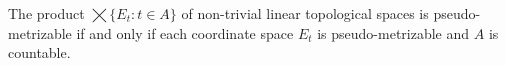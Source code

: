 The product $\bigtimes \{E_t : t \in A\}$ of non-trivial linear topological spaces is pseudo-metrizable if and only if each coordinate space $E_t$ is pseudo-metrizable and $A$ is countable.
